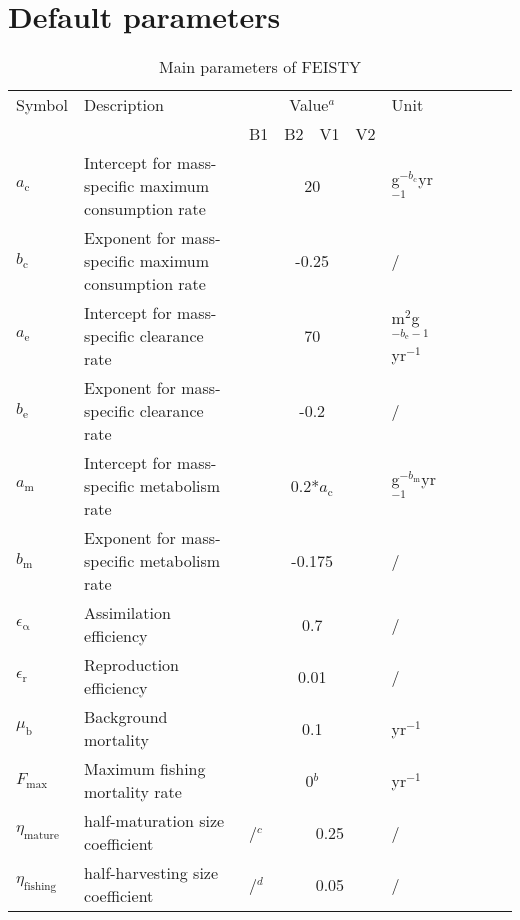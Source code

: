 \documentclass[
]{article}
\begin{document}
\newpage

\hypertarget{default-parameters}{%
\section{Default parameters}\label{default-parameters}}

\begin{table}[htbp]

\centering
\caption{Main parameters of FEISTY}
\label{tab:defaultparam}

\begin{tabular}{lp{8cm}lp{1cm}lp{1cm}lp{1cm}lp{1cm}l}
\hline
Symbol & Description & \multicolumn{4}{c}{Value$^a$} & Unit \\
                         \cline{3-6}
       &             & \multicolumn{1}{c}{B1} & \multicolumn{1}{c}{B2} & \multicolumn{1}{c}{V1} & \multicolumn{1}{c}{V2} & \\
\hline
$a_\mathrm{c}$ & Intercept for mass-specific maximum consumption rate & \multicolumn{4}{c}{20} & g$^{-b_{\mathrm{c}}}$yr$^{-1}$ \\
$b_\mathrm{c}$ & Exponent for mass-specific maximum consumption rate & \multicolumn{4}{c}{-0.25} & / \\
$a_\mathrm{e}$ & Intercept for mass-specific clearance rate & \multicolumn{4}{c}{70} & m$^2$g$^{-b_{\mathrm{e}}-1}$yr$^{-1}$ \\
$b_\mathrm{e}$ & Exponent for mass-specific clearance rate & \multicolumn{4}{c}{-0.2} & / \\
$a_\mathrm{m}$ & Intercept for mass-specific metabolism rate & \multicolumn{4}{c}{0.2*$a_{\mathrm{c}}$} & g$^{-b_{\mathrm{m}}}$yr$^{-1}$ \\
$b_\mathrm{m}$ & Exponent for mass-specific metabolism rate & \multicolumn{4}{c}{-0.175} & / \\
$\epsilon_{\mathrm{\alpha}}$ & Assimilation efficiency & \multicolumn{4}{c}{0.7} & / \\
$\epsilon_{\mathrm{r}}$ & Reproduction efficiency & \multicolumn{4}{c}{0.01} & / \\
$\mu_\mathrm{b}$ & Background mortality & \multicolumn{4}{c}{0.1} & yr$^{-1}$ \\
$F_{\mathrm{max}}$ & Maximum fishing mortality rate & \multicolumn{4}{c}{0$^b$} & yr$^{-1}$ \\
$\eta_{\mathrm{mature}}$ & half-maturation size coefficient & /$^c$ & \multicolumn{3}{c}{0.25} & / \\
$\eta_{\mathrm{fishing}}$ & half-harvesting size coefficient & /$^d$ & \multicolumn{3}{c}{0.05} & / \\

\end{tabular}
\end{table}
\end{document}
